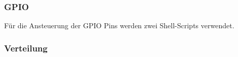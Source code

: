 \subsubsection{GPIO}
Für die Ansteuerung der GPIO Pins werden zwei Shell-Scripts verwendet.



\subsubsection{Verteilung}